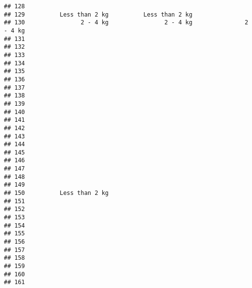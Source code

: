 \documentclass[
]{article}
\begin{document}
\begin{verbatim}
## 128                                                                       
## 129          Less than 2 kg          Less than 2 kg                       
## 130                2 - 4 kg                2 - 4 kg               2 - 4 kg
## 131                                                                       
## 132                                                                       
## 133                                                                       
## 134                                                                       
## 135                                                                       
## 136                                                                       
## 137                                                                       
## 138                                                                       
## 139                                                                       
## 140                                                                       
## 141                                                                       
## 142                                                                       
## 143                                                                       
## 144                                                                       
## 145                                                                       
## 146                                                                       
## 147                                                                       
## 148                                                                       
## 149                                                                       
## 150          Less than 2 kg                                               
## 151                                                                       
## 152                                                                       
## 153                                                                       
## 154                                                                       
## 155                                                                       
## 156                                                                       
## 157                                                                       
## 158                                                                       
## 159                                                                       
## 160                                                                       
## 161                                                                       

\end{verbatim}
\end{document}
